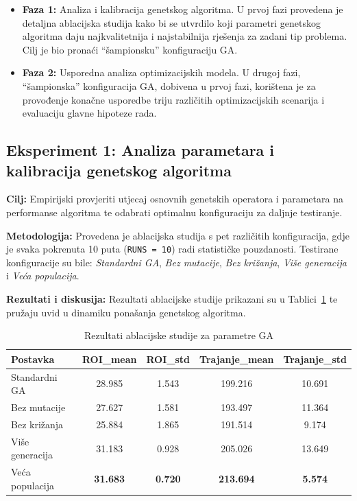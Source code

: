 \begin{itemize}
  \item \textbf{Faza 1:} Analiza i kalibracija genetskog algoritma. U prvoj fazi provedena je detaljna ablacijska studija kako bi se utvrdilo koji parametri genetskog algoritma daju najkvalitetnija i najstabilnija rješenja za zadani tip problema. Cilj je bio pronaći ``šampionsku'' konfiguraciju GA.
  
  \item \textbf{Faza 2:} Usporedna analiza optimizacijskih modela. U drugoj fazi, ``šampionska'' konfiguracija GA, dobivena u prvoj fazi, korištena je za provođenje konačne usporedbe triju različitih optimizacijskih scenarija i evaluaciju glavne hipoteze rada.
\end{itemize}

\subsection{Eksperiment 1: Analiza parametara i kalibracija genetskog algoritma}

\textbf{Cilj:} Empirijski provjeriti utjecaj osnovnih genetskih operatora i parametara na performanse algoritma te odabrati optimalnu konfiguraciju za daljnje testiranje.

\textbf{Metodologija:} Provedena je ablacijska studija s pet različitih konfiguracija, gdje je svaka pokrenuta 10 puta (\texttt{RUNS = 10}) radi statističke pouzdanosti. Testirane konfiguracije su bile: \emph{Standardni GA}, \emph{Bez mutacije}, \emph{Bez križanja}, \emph{Više generacija} i \emph{Veća populacija}.

\textbf{Rezultati i diskusija:} Rezultati ablacijske studije prikazani su u Tablici~\ref{tab:ga_ablation} te pružaju uvid u dinamiku ponašanja genetskog algoritma.

\begin{table}[H]
\centering
\caption{Rezultati ablacijske studije za parametre GA}
\label{tab:ga_ablation}
\begin{tabular}{|l|c|c|c|c|}
\hline
\textbf{Postavka} & \textbf{ROI\_mean} & \textbf{ROI\_std} & \textbf{Trajanje\_mean} & \textbf{Trajanje\_std} \\
\hline
Standardni GA     & 28.985  & 1.543  & 199.216  & 10.691 \\
Bez mutacije      & 27.627  & 1.581  & 193.497  & 11.364 \\
Bez križanja      & 25.884  & 1.865  & 191.514  & 9.174  \\
Više generacija   & 31.183  & 0.928  & 205.026  & 13.649 \\
Veća populacija   & \textbf{31.683}  & \textbf{0.720}  & \textbf{213.694}  & \textbf{5.574}  \\
\hline
\end{tabular}
\end{table}

